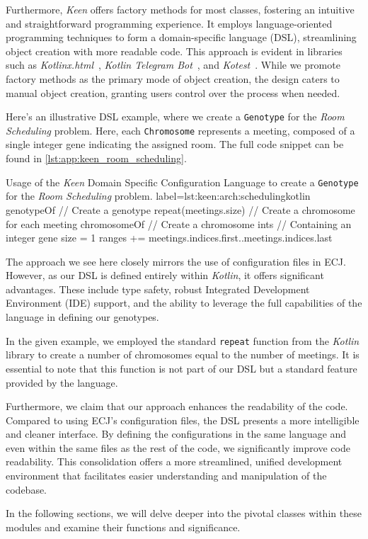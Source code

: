   Furthermore, \textit{Keen} offers factory methods for most classes, fostering an intuitive and straightforward programming experience. It employs language-oriented programming techniques to form a domain-specific language (DSL), streamlining object creation with more readable code. This approach is evident in libraries such as 
  \textit{Kotlinx.html}~\autocite{KotlinxHtml2023}, \textit{Kotlin Telegram Bot}~\autocite{KotlinTelegramBot2023}, and \textit{Kotest}~\autocite{KotestKotesta}. While we promote factory methods as the primary mode of object creation, the design caters to manual object creation, granting users control over the process when needed.


  Here's an illustrative DSL example, where we create a \texttt{Genotype} for the \textit{Room Scheduling} problem. Here, each \texttt{Chromosome} represents a meeting, composed of a single integer gene indicating the assigned room. The full code snippet can be found in \vref{lst:app:keen_room_scheduling}.

  \begin{code}{
      Usage of the \textit{Keen} Domain Specific Configuration Language to create a \texttt{Genotype} for the 
      \textit{Room Scheduling} problem.
  }{label={lst:keen:arch:scheduling}}{kotlin}
    genotypeOf {                // Create a genotype
        repeat(meetings.size) { // Create a chromosome for each meeting
            chromosomeOf {      // Create a chromosome
                ints {          // Containing an integer gene
                    size = 1    
                    ranges += meetings.indices.first..meetings.indices.last
                }
            }
        }
    }
  \end{code}

  The approach we see here closely mirrors the use of configuration files in ECJ. However, as our DSL is defined entirely within \textit{Kotlin}, it offers significant advantages. These include type safety, robust Integrated Development Environment (IDE) support, and the ability to leverage the full capabilities of the language in defining our genotypes.

  In the given example, we employed the standard \texttt{repeat} function from the \textit{Kotlin} library to create a number of chromosomes equal to the number of meetings. It is essential to note that this function is not part of our DSL but a standard feature provided by the language.

  Furthermore, we claim that our approach enhances the readability of the code. Compared to using ECJ's configuration files, the DSL presents a more intelligible and cleaner interface.
  By defining the configurations in the same language and even within the same files as the rest of the code, we significantly improve code readability.
  This consolidation offers a more streamlined, unified development environment that facilitates easier understanding and manipulation of the codebase.

  In the following sections, we will delve deeper into the pivotal classes within these modules and examine their functions and significance.
